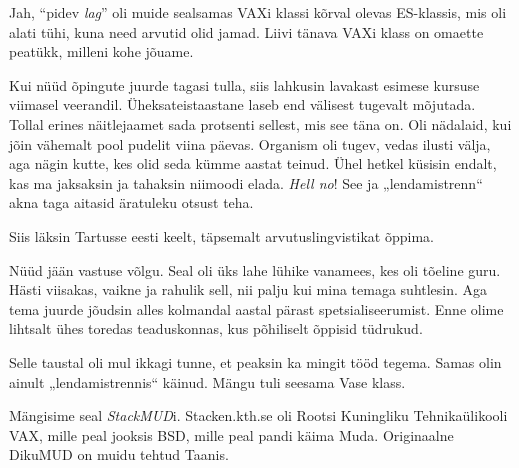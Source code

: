 
Jah, \enquote{pidev \emph{lag}} oli muide sealsamas VAXi klassi kõrval olevas 
ES-klassis, mis oli alati tühi, kuna need arvutid olid jamad. Liivi tänava 
VAXi klass on omaette peatükk, milleni kohe jõuame.

Kui nüüd õpingute juurde tagasi tulla, siis lahkusin lavakast esimese kursuse viimasel veerandil. Üheksateistaastane laseb end
välisest tugevalt mõjutada. Tollal erines
näitlejaamet sada protsenti sellest, mis see täna on. 
Oli nädalaid, kui jõin vähemalt pool pudelit viina päevas. 
Organism oli tugev, vedas ilusti välja, aga nägin kutte, kes olid 
seda kümme aastat teinud. Ühel hetkel küsisin endalt, kas ma jaksaksin 
ja tahaksin niimoodi elada. \emph{Hell no}! See ja „lendamistrenn“ akna taga aitasid äratuleku otsust teha. 

Siis läksin Tartusse eesti keelt, täpsemalt 
arvutuslingvistikat õppima.


Nüüd jään vastuse võlgu. Seal oli üks lahe lühike vanamees, kes 
oli tõeline guru. Hästi viisakas, vaikne ja rahulik sell, nii palju kui 
mina temaga suhtlesin. Aga tema juurde jõudsin alles kolmandal aastal pärast 
spetsialiseerumist. Enne olime lihtsalt ühes toredas teaduskonnas, kus 
põhiliselt õppisid tüdrukud.

Selle taustal oli mul ikkagi tunne, et peaksin ka mingit tööd tegema. Samas olin
ainult „lendamistrennis“ käinud. Mängu tuli seesama Vase klass.

Mängisime seal \emph{StackMUD}i. Stacken.kth.se oli Rootsi 
Kuningliku Tehnikaülikooli 
VAX, mille peal 
jooksis BSD, mille peal pandi käima Muda. 
Originaalne DikuMUD on muidu tehtud Taanis.

